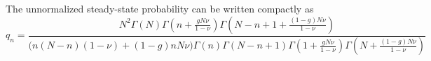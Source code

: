 %
The unnormalized steady-state probability can be written compactly as%
\begin{equation*}%
q_n = \frac{ N^2\Gamma(N) \Gamma\left(n+\frac{g N\nu}{1-\nu}\right) \Gamma\left(N-n+1+\frac{(1-g) N\nu}{1-\nu}\right) }{ \big(n(N-n)(1-\nu)+(1-g)n N\nu\big) \Gamma(n) \Gamma(N-n+1) \Gamma\left(1+\frac{g N\nu}{1-\nu}\right) \Gamma\left(N+\frac{(1-g) N\nu}{1-\nu}\right)}
\end{equation*}
